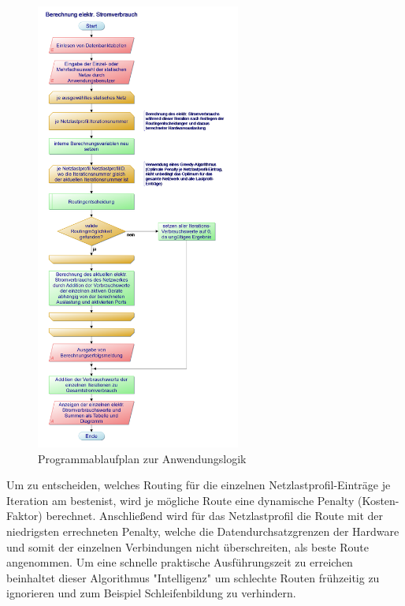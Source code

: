 \documentclass[12pt,titlepage]{article}
\begin{document}
\begin{figure}[!]
	\centering
	\includegraphics[width=0.6\textwidth]{1Berechnung_elektr_Stromverbrauch}
	\caption{Programmablaufplan zur Anwendungslogik}
	\label{fig:1Berechnung_elektr_Stromverbrauch}
\end{figure}
Um zu entscheiden, welches Routing für die einzelnen Netzlastprofil-Einträge je Iteration am \glqq besten\grqq ist, wird je mögliche Route eine dynamische Penalty (Kosten-Faktor) berechnet. Anschließend wird für das Netzlastprofil die Route mit der niedrigsten errechneten Penalty, welche die Datendurchsatzgrenzen der Hardware und somit der einzelnen Verbindungen nicht überschreiten, als beste Route angenommen. Um eine schnelle praktische Ausführungszeit zu erreichen beinhaltet dieser Algorithmus "Intelligenz" um schlechte Routen frühzeitig zu ignorieren und zum Beispiel Schleifenbildung zu verhindern.
\end{document}

